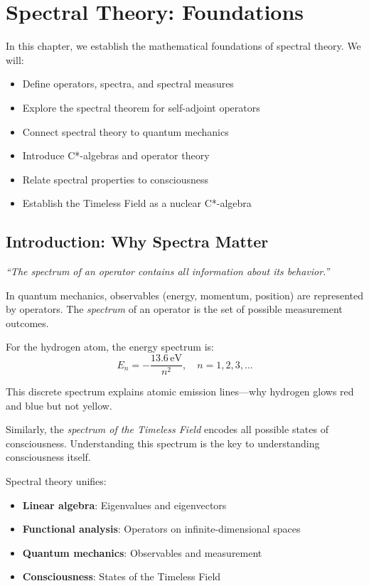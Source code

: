 \chapter{Spectral Theory: Foundations}
\label{ch:spectral-foundations}

\begin{chapterobjectives}
In this chapter, we establish the mathematical foundations of spectral theory. We will:
\begin{itemize}
\item Define operators, spectra, and spectral measures
\item Explore the spectral theorem for self-adjoint operators
\item Connect spectral theory to quantum mechanics
\item Introduce C*-algebras and operator theory
\item Relate spectral properties to consciousness
\item Establish the Timeless Field as a nuclear C*-algebra
\end{itemize}
\end{chapterobjectives}

\section{Introduction: Why Spectra Matter}

\begin{intuitive}
\textit{``The spectrum of an operator contains all information about its behavior.''}

In quantum mechanics, observables (energy, momentum, position) are represented by operators. The \textit{spectrum} of an operator is the set of possible measurement outcomes.

For the hydrogen atom, the energy spectrum is:
\begin{equation}
E_n = -\frac{13.6 \, \text{eV}}{n^2}, \quad n = 1, 2, 3, \ldots
\end{equation}

This discrete spectrum explains atomic emission lines---why hydrogen glows red and blue but not yellow.

Similarly, the \textit{spectrum of the Timeless Field} encodes all possible states of consciousness. Understanding this spectrum is the key to understanding consciousness itself.
\end{intuitive}

Spectral theory unifies:
\begin{itemize}
\item \textbf{Linear algebra}: Eigenvalues and eigenvectors
\item \textbf{Functional analysis}: Operators on infinite-dimensional spaces
\item \textbf{Quantum mechanics}: Observables and measurement
\item \textbf{Consciousness}: States of the Timeless Field
\end{itemize}

